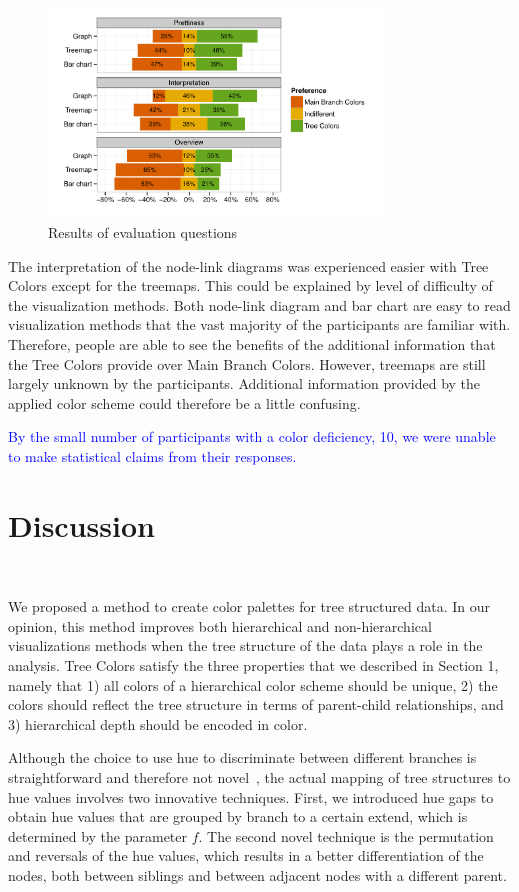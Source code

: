 \documentclass[review,journal]{vgtc}         %
\newcommand{\changedM}[1]{\textcolor{blue}{#1}}
\begin{document}
\begin{figure}[tb]
  \centering
	\includegraphics[width=3.5in]{user_study_results2.pdf}
  \caption{Results of evaluation questions}\label{fig:user2}
\end{figure}


The interpretation of the node-link diagrams was experienced easier with Tree Colors except for the treemaps. This could be explained by level of difficulty of the visualization methods. Both node-link diagram and bar chart are easy to read visualization methods that the vast majority of the participants are familiar with. Therefore, people are able to see the benefits of the additional information that the Tree Colors provide over Main Branch Colors. However, treemaps are still largely unknown by the participants. Additional information provided by the applied color scheme could therefore be a little confusing.

\changedM{By the small number of participants with a color deficiency, 10, we were unable to make statistical claims from their responses.}


\section{Discussion}~\label{secdisc}

We proposed a method to create color palettes for tree structured data. In our opinion, this method improves both hierarchical and non-hierarchical visualizations methods when the tree structure of the data plays a role in the analysis. Tree Colors satisfy the three properties that we described in Section 1, namely that 1) all colors of a hierarchical color scheme should be unique, 2) the colors should reflect the tree structure in terms of parent-child relationships, and 3) hierarchical depth should be encoded in color. 

Although the choice to use hue to discriminate between different branches is straightforward and therefore not novel~\cite{yang2002, lam2012}, the actual mapping of tree structures to hue values involves two innovative techniques. First, we introduced hue gaps to obtain hue values that are grouped by branch to a certain extend, which is determined by the parameter $f$. The second novel technique is the permutation and reversals of the hue values, which results in a better differentiation of the nodes, both between siblings and between adjacent nodes with a different parent.
\end{document}
